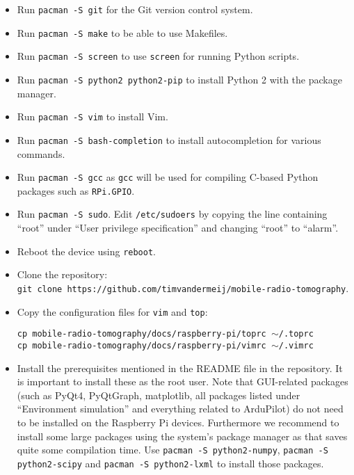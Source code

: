 \documentclass{article}
\begin{document}
\begin{itemize}
    \item Run {\tt pacman -S git} for the Git version control system.
    \item Run {\tt pacman -S make} to be able to use Makefiles.
    \item Run {\tt pacman -S screen} to use {\tt screen} for running Python
          scripts.
    \item Run {\tt pacman -S python2 python2-pip} to install Python 2 with the 
          package manager.
    \item Run {\tt pacman -S vim} to install Vim.
    \item Run {\tt pacman -S bash-completion} to install autocompletion for 
          various commands.
    \item Run {\tt pacman -S gcc} as {\tt gcc} will be used for compiling 
          C-based Python packages such as {\tt RPi.GPIO}.
    \item Run {\tt pacman -S sudo}. Edit {\tt /etc/sudoers} by copying the line 
          containing ``root'' under ``User privilege specification'' and 
          changing ``root'' to ``alarm''.
    \item Reboot the device using {\tt reboot}.
    \item Clone the repository: \\ {\tt git clone 
          https://github.com/timvandermeij/mobile-radio-tomography}.
    \item Copy the configuration files for {\tt vim} and {\tt top}:
        
          {\tt cp mobile-radio-tomography/docs/raspberry-pi/toprc 
          $\sim$/.toprc} \\
          {\tt cp mobile-radio-tomography/docs/raspberry-pi/vimrc 
          $\sim$/.vimrc}
    \item Install the prerequisites mentioned in the README file in the 
          repository. It is important to install these as the root user. Note 
          that GUI-related packages (such as PyQt4, PyQtGraph, matplotlib, all 
          packages listed under ``Environment simulation'' and everything 
          related to ArduPilot) do not need to be installed on the Raspberry Pi 
          devices. Furthermore we recommend to install some large packages 
          using the system's package manager as that saves quite some 
          compilation time. Use {\tt pacman -S python2-numpy}, {\tt pacman -S 
          python2-scipy} and {\tt pacman -S python2-lxml} to install those 
          packages.
\end{itemize}
\end{document}
